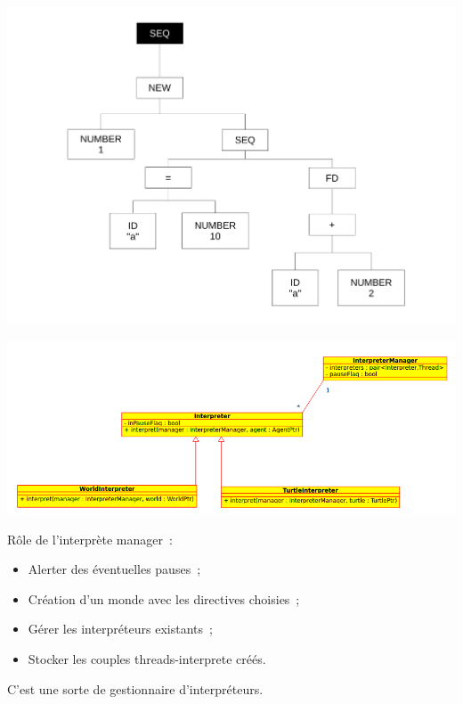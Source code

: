 \begin{frame}
\includegraphics[scale=0.3]{doc/Presentation/img/arbre1.pdf}
\end{frame}

\begin{frame}
\includegraphics[scale=0.3]{doc/report/uml/interpreterUML.png}
\end{frame}

\begin{frame}
Rôle de l'interprète manager~:
\begin{itemize}
	\item Alerter des éventuelles pauses~;
	\item Création d'un monde avec les directives choisies~;
	\item Gérer les interpréteurs existants~;
	\item Stocker les couples threads-interprete créés.
\end{itemize}
C'est une sorte de gestionnaire d'interpréteurs.
\end{frame}
